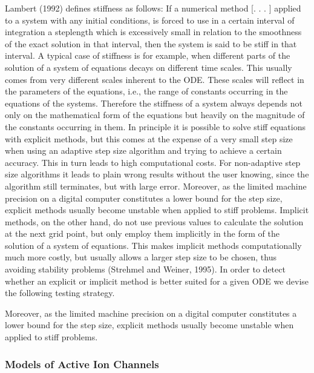 Lambert (1992) defines stiffness as follows:
If a numerical method [. . . ] applied to a system
with any initial conditions, is forced to use in a
certain interval of integration a steplength which is
excessively small in relation to the smoothness of the
exact solution in that interval, then the system is said
to be stiff in that interval.
A typical case of stiffness is for example, when different parts of
the solution of a system of equations decays on different time
scales.
This usually comes from very different scales inherent to the
ODE. These scales will reflect in the parameters of the equations,
i.e., the range of constants occurring in the equations of the
systems. Therefore the stiffness of a system always depends not
only on the mathematical form of the equations but heavily on
the magnitude of the constants occurring in them.
In principle it is possible to solve stiff equations with explicit
methods, but this comes at the expense of a very small step size
when using an adaptive step size algorithm and trying to achieve
a certain accuracy. This in turn leads to high computational
costs. For non-adaptive step size algorithms it leads to plain
wrong results without the user knowing, since the algorithm
still terminates, but with large error. Moreover, as the limited
machine precision on a digital computer constitutes a lower
bound for the step size, explicit methods usually become unstable
when applied to stiff problems.
Implicit methods, on the other hand, do not use previous
values to calculate the solution at the next grid point, but only
employ them implicitly in the form of the solution of a system of
equations. This makes implicit methods computationally much
more costly, but usually allows a larger step size to be chosen,
thus avoiding stability problems (Strehmel and Weiner, 1995).
In order to detect whether an explicit or implicit method is
better suited for a given ODE we devise the following testing
strategy.

Moreover, as the limited
machine precision on a digital computer constitutes a lower
bound for the step size, explicit methods usually become unstable
when applied to stiff problems.


\subsubsection{Models of Active Ion Channels}

